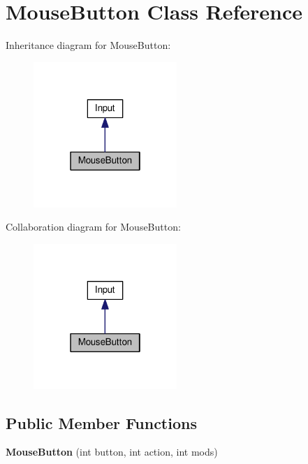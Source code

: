 \hypertarget{classMouseButton}{}\section{Mouse\+Button Class Reference}
\label{classMouseButton}


Inheritance diagram for Mouse\+Button\+:\nopagebreak
\begin{figure}[H]
\begin{center}
\leavevmode
\includegraphics[width=154pt]{classMouseButton__inherit__graph}
\end{center}
\end{figure}


Collaboration diagram for Mouse\+Button\+:\nopagebreak
\begin{figure}[H]
\begin{center}
\leavevmode
\includegraphics[width=154pt]{classMouseButton__coll__graph}
\end{center}
\end{figure}
\subsection*{Public Member Functions}
\begin{DoxyCompactItemize}
\item 
\hypertarget{classMouseButton_ad2a2ab9c8a5d0a95bae134566462136c}{}{\bfseries Mouse\+Button} (int button, int action, int mods)\label{classMouseButton_ad2a2ab9c8a5d0a95bae134566462136c}

\end{DoxyCompactItemize}

